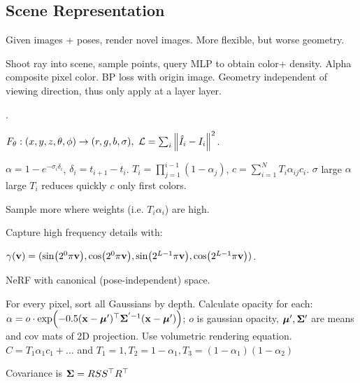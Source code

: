 \subsection{Scene Representation}
Given images + poses, render novel images. More flexible, but worse geometry.

\begin{definition}
    Shoot ray into scene, sample points, query MLP to obtain color+ density. Alpha composite pixel color. BP loss with origin image. Geometry independent of viewing direction, thus only apply at a layer layer.

     .
\end{definition}

\begin{definition}[Training]
    \(F_\theta: (x, y, z, \theta, \phi) \to (r, g, b, \sigma), \ \L = \sum_i \norm{\hat I_i - I_i}^2\).
\end{definition}

\begin{definition}
    \(\alpha = 1 - e^{-\sigma_i \delta_i}\), \(\delta_i = t_{i+1} - t_i\).
    \(T_i = \prod_{j = 1}^{i-1}(1 - \alpha_j)\), \(c = \sum_{i = 1}^N T_i \alpha_{ij} c_i\). \(\sigma\) large \(\alpha\) large \(T_i\) reduces quickly \(c\) only first colors.
\end{definition}

\begin{definition}
    Sample more where weights (i.e. \(T_i \alpha_i\)) are high.
\end{definition}

\begin{definition}
    Capture high frequency details with:
    
    \(\gamma(\v) = (\sin(2^0 \pi \v), \cos(2^0 \pi \v), \sin(2^{L-1}\pi\v), \cos(2^{L-1}\pi\v))\).
\end{definition}

\begin{definition}[SNARF]
    NeRF with canonical (pose-independent) space.
\end{definition}

\begin{definition}
    For every pixel, sort all Gaussians by depth. Calculate opacity for each: \(\alpha = o \cdot \exp(- 0.5(\x - \m')^\top \S^{'-1}(\x - \m'))\); \(o\) is gaussian opacity, \(\m', \S'\) are means and cov mats of 2D projection. Use volumetric rendering equation. \(C = T_1 \alpha_1 c_1 + \ldots\) and \(T_1 = 1, T_2 = 1 - \alpha_1, T_3 = (1 - \alpha_1)(1 - \alpha_2)\)
    
    Covariance is \(\S = RSS^\top R^\top\)
\end{definition}

